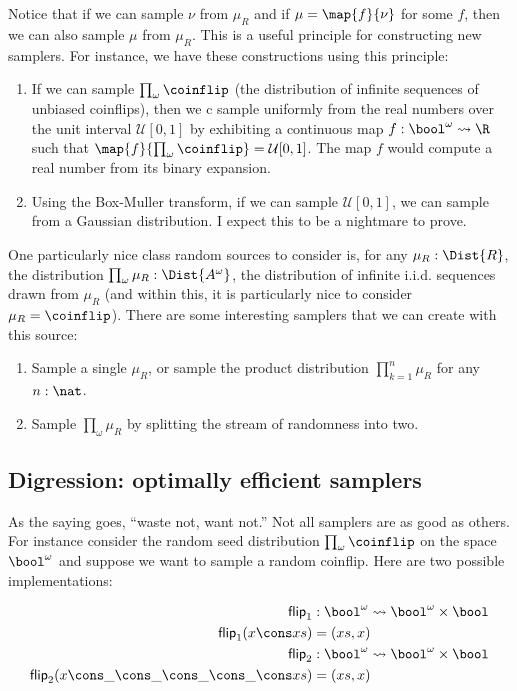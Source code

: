 Notice that if we can sample $\nu$ from $\mu_R$ and if $\mu = \map{f}{\nu}$ for some $f$, then we can also sample $\mu$ from $\mu_R$. This is a useful principle for constructing new samplers. For instance, we have these constructions using this principle:
\begin{enumerate}
\item If we can sample $\prod_\omega \coinflip$ (the distribution of infinite sequences of unbiased coinflips), then we c sample uniformly from the real numbers over the unit interval $\mathcal{U}[0,1]$ by exhibiting a continuous map $f : \bool^\omega \leadsto \R$ such that $\map{f}{\prod_\omega \coinflip} = \mathcal{U}[0,1]$. The map $f$ would compute a real number from its binary expansion.
\item Using the Box-Muller transform, if we can sample $\mathcal{U}[0,1]$, we can sample from a Gaussian distribution. I expect this to be a nightmare to prove.
\end{enumerate}

One particularly nice class random sources to consider is, for any $\mu_R : \Dist{R}$, the distribution $\prod_\omega \mu_R : \Dist{A^\omega}$, the distribution of infinite i.i.d. sequences drawn from $\mu_R$ (and within this, it is particularly nice to consider $\mu_R = \coinflip$). There are some interesting samplers that we can create with this source:
\begin{enumerate}
\item Sample a single $\mu_R$, or sample the product distribution $\prod_{k=1}^n \mu_R$ for any $n : \nat$.
\item Sample $\prod_\omega \mu_R$ by splitting the stream of randomness into two.
\end{enumerate}

\subsection{Digression: optimally efficient samplers}

As the saying goes, ``waste not, want not.'' Not all samplers are as good as others. For instance consider the random seed distribution $\prod_\omega \coinflip$ on the space $\bool^\omega$ and suppose we want to sample a random coinflip. Here are two possible implementations:

\begin{align*}
\mathsf{flip}_1 &: \bool^\omega \leadsto \bool^\omega \times \bool
\\ \mathsf{flip}_1 (x \cons xs) &= (xs, x)
\\ \mathsf{flip}_2 &: \bool^\omega \leadsto \bool^\omega \times \bool
\\ \mathsf{flip}_2 (x \cons \_ \cons \_ \cons \_ \cons \_ \cons xs) &= (xs, x)
\end{align*}

